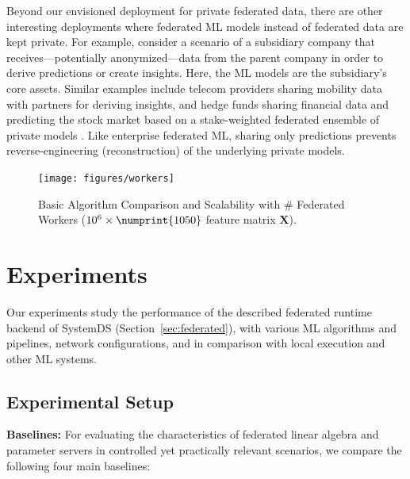 \documentclass[sigconf,screen]{acmart}
\newcommand{\mat}[1]{\ensuremath{\mathbf{#1}}}
\newcommand{\num}[1]{\numprint{#1}}
\begin{document}
Beyond our envisioned deployment for private federated data, there are other interesting deployments where federated ML models instead of federated data are kept private. For example, consider a scenario of a subsidiary company that receives---potentially anonymized---data from the parent company in order to derive predictions or create insights. Here, the ML models are the subsidiary's core assets. 
Similar examples include telecom providers sharing mobility data with partners for deriving insights, and hedge funds sharing financial data and predicting the stock market based on a stake-weighted federated ensemble of private models \cite{numerai}. Like enterprise federated ML, sharing only predictions prevents reverse-engineering (reconstruction) of the underlying private models.

\begin{figure}[!h]
	\centering
	\texttt{[image: figures/workers]}
	\vspace{-0.25cm}
	\caption{\label{fig:exp1}Basic Algorithm Comparison and Scalability 
	with \# Federated Workers ($10^6 \times \num{1050}$ feature matrix $\mat{X}$).}
	\vspace{-0.2cm}
\end{figure}

\section{Experiments}
\label{sec:experiments}

Our experiments study the performance of the described federated runtime backend of SystemDS (Section~\ref{sec:federated}), with various ML algorithms and pipelines, network configurations, and in comparison with local execution and other ML systems.

\subsection{Experimental Setup}
\label{sec:setup}

\textbf{Baselines:} For evaluating the characteristics of federated linear algebra and parameter servers in controlled yet practically relevant scenarios, we compare the following four main baselines:
\end{document}

